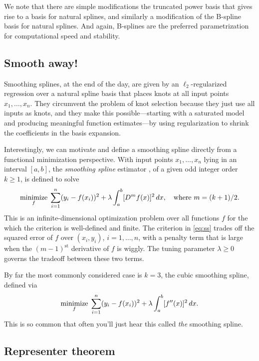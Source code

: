 \documentclass{article}
\begin{document}
We note that there are simple modifications the truncated power basis that gives
rise to a basis for natural splines, and similarly a modification of the
B-spline basis for natural splines. And again, B-splines are the preferred
parametrization for computational speed and stability. 

\subsection{Smooth away!}

Smoothing splines, at the end of the day, are given by an $\ell_2$-regularized
regression over a natural spline basis that places knots at all input points 
$x_1,\dots,x_n$. They circumvent the problem of knot selection because they
just use all inputs as knots, and they make this possible---starting with a 
saturated model and producing meaningful function estimates---by using
regularization to shrink the coefficients in the basis expansion.

Interestingly, we can motivate and define a smoothing spline directly from a
functional minimization perspective. With input points $x_1,\dots,x_n$ lying in 
an interval $[a,b]$, the \emph{smoothing spline} estimator \smash{$\hf$}, of a
given odd integer order $k \geq 1$, is defined to solve   
\begin{equation}
\label{eq:ss}
\mathop{\mathrm{minimize}}_f \; \sum_{i=1}^n (y_i - f(x_i))^2 + \lambda \int_a^b [D^m f(x)]^2 \,
dx, \quad \text{where $m=(k+1)/2$}.
\end{equation}
This is an infinite-dimensional optimization problem over all functions $f$ for
the which the criterion is well-defined and finite. The criterion in
\eqref{eq:ss} trades off the squared error of $f$ over $(x_i,y_i)$,
$i=1,\dots,n$, with a penalty term that is large when the $(m-1)^{\text{st}}$
derivative of $f$ is wiggly. The tuning parameter $\lambda \geq 0$ governs the
tradeoff between these two terms.  

By far the most commonly considered case is $k=3$, the cubic smoothing spline,
defined via 
\begin{equation}
\label{eq:ss_cubic}
\mathop{\mathrm{minimize}}_f \; \sum_{i=1}^n (y_i - f(x_i))^2 + \lambda \int_a^b [f''(x)]^2 \, dx.
\end{equation}
This is so common that often you'll just hear this called \emph{the} smoothing
spline. 

\subsection{Representer theorem}
\end{document}
